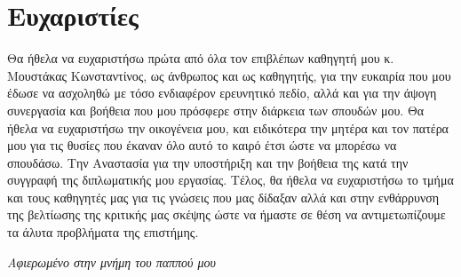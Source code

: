 \section*{Ευχαριστίες}

Θα ήθελα να ευχαριστήσω πρώτα από όλα τον επιβλέπων καθηγητή μου κ. Μουστάκας Κωνσταντίνος, ως άνθρωπος και ως καθηγητής, για την ευκαιρία που μου έδωσε να ασχοληθώ με τόσο ενδιαφέρον ερευνητικό πεδίο, αλλά και για την άψογη συνεργασία και βοήθεια που μου πρόσφερε στην διάρκεια των σπουδών μου. Θα ήθελα να ευχαριστήσω την οικογένεια μου, και ειδικότερα την μητέρα και τον πατέρα μου για τις θυσίες που έκαναν όλο αυτό το καιρό έτσι ώστε να μπορέσω να σπουδάσω. Την Αναστασία για την υποστήριξη και την βοήθεια της κατά την συγγραφή της διπλωματικής μου εργασίας. Τέλος, θα ήθελα να ευχαριστήσω το τμήμα και τους καθηγητές μας για τις γνώσεις που μας δίδαξαν αλλά και στην ενθάρρυνση της βελτίωσης της κριτικής μας σκέψης ώστε να ήμαστε σε θέση να αντιμετωπίζουμε τα άλυτα προβλήματα της επιστήμης.

\thispagestyle{empty}
\clearpage

\begin{center}
  \null\vfill
  \large{{\em Αφιερωμένο στην μνήμη του παππού μου}}
  \vspace{2cm}
  \null\vfill
\end{center}

\thispagestyle{empty} 